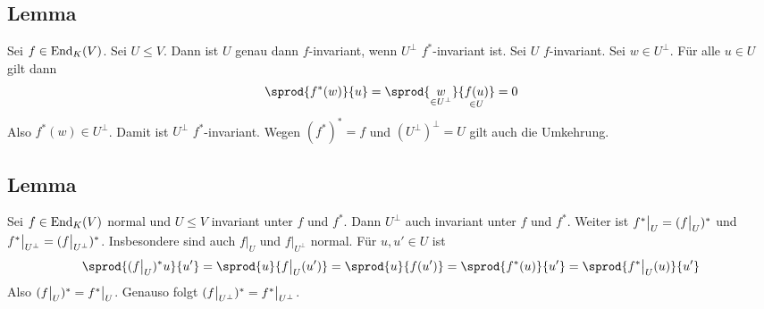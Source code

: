 \subsection[Lemma über $f$-Invarianz eines Unterraums und seines orthogonalen Komplements]{Lemma} %
\label{sub:135}
Sei $f \in \operatorname{End}_K(V)$. Sei $U \le V$. Dann ist $U$ genau dann $f$-invariant, wenn $U^\bot $ $f^*$-invariant ist.
Sei $U$ $f$-invariant. Sei $w \in U^\bot$. Für alle $u \in U$ gilt dann
\[
	\sprod{f^* (w)}{u}  = \sprod{\underset{\in U^\bot}{w}}{\underset{\in U}{f(u)}} = 0
\]
Also $f^*(w) \in U^\bot$. Damit ist $U^\bot$ $f^*$-invariant. Wegen $(f^*)^*=f$ und $(U^\bot)^\bot=U$ gilt auch die Umkehrung. \bewende

\subsection[Lemma über einen Unterraum, der sowohl $f$- als auch $f^*$-invariant ist]{Lemma} %
\label{sub:136}
Sei $f \in\operatorname{End}_K(V)$ normal und $U\le V$ invariant unter $f$ und $f^*$. Dann $U^\bot$ auch invariant unter $f$ und $f^*$. Weiter ist 
$f^* \big|_U = (f \big|_U)^*$ 
und $f^* \big|_{U^\bot} = (f\big|_{U^\bot})^* $. Insbesondere sind auch $f|_U$ und $f|_{U^\bot}$ normal.
Für $u,u' \in U$ ist
\[
	\sprod{\enbrace{f\big|_U}^* u }{u'} = \sprod{u}{f\big|_U (u')} = \sprod{u}{f(u')} = \sprod{f^* (u)}{u'} = \sprod{f^*\big|_U (u)}{u'}     
\]
Also $(f\big|_U)^* = f^*\big|_U $. Genauso folgt $(f\big|_{U^\bot})^* = f^* \big|_{U^\bot} $. \bewende

